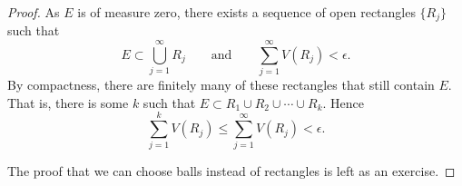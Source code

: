\begin{proof}
As $E$ is of measure zero,
there exists a sequence of open rectangles $\{ R_j \}$ such that 
\begin{equation*}
E \subset \bigcup_{j=1}^\infty R_j
\qquad \text{and} \qquad
\sum_{j=1}^\infty V(R_j) < \epsilon.
\end{equation*}
By compactness, there are finitely
many of these rectangles that still contain $E$.  That is, there is some $k$ such
that
$E \subset R_1 \cup R_2 \cup \cdots \cup R_k$.  Hence
\begin{equation*}
\sum_{j=1}^k V(R_j) \leq
\sum_{j=1}^\infty V(R_j) < \epsilon.
\end{equation*}

The proof that we can choose balls instead of rectangles is left as an
exercise.
\end{proof}

